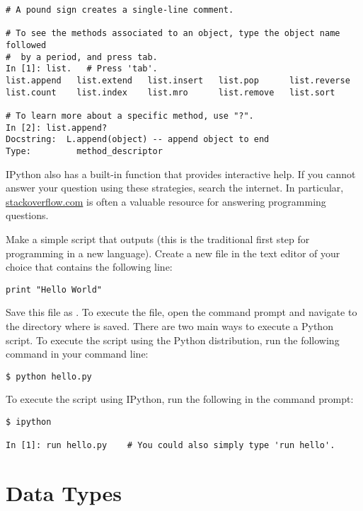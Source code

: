 \begin{lstlisting}
# A pound sign creates a single-line comment.

# To see the methods associated to an object, type the object name followed
#  by a period, and press tab.
In [1]: list.   # Press 'tab'.
list.append   list.extend   list.insert   list.pop      list.reverse  
list.count    list.index    list.mro      list.remove   list.sort

# To learn more about a specific method, use "?".
In [2]: list.append?
Docstring:  L.append(object) -- append object to end
Type:         method_descriptor
\end{lstlisting}

IPython also has a built-in function  that provides interactive help.
If you cannot answer your question using these strategies, search the internet.
In particular, \href{http://stackoverflow.com/}{stackoverflow.com} is often a valuable resource for answering programming questions.

\begin{problem}
Make a simple script that outputs  (this is the traditional first step for programming in a new language).
Create a new file in the text editor of your choice that contains the following line:
\begin{lstlisting}
print "Hello World"
\end{lstlisting}
Save this file as .
To execute the file, open the command prompt and navigate to the directory where  is saved.
There are two main ways to execute a Python script.
To execute the script using the Python distribution, run the following command in your command line:
\begin{lstlisting}
$ python hello.py
\end{lstlisting}
To execute the script using IPython, run the following in the command prompt:
\begin{lstlisting}
$ ipython

In [1]: run hello.py    # You could also simply type 'run hello'.
\end{lstlisting}
\end{problem}

\section*{Data Types}


